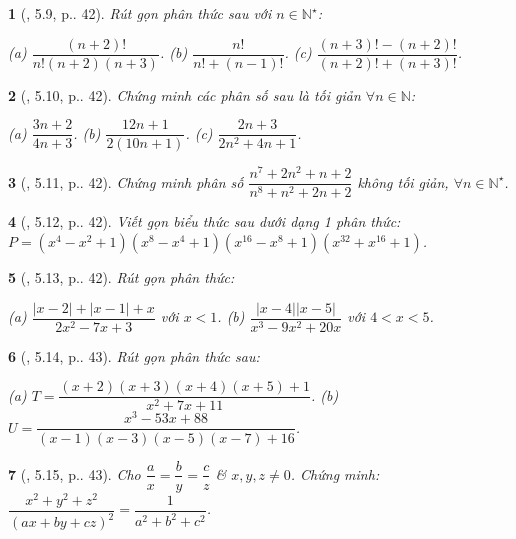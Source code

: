 \documentclass{article}
\newtheorem{baitoan}{}
\begin{document}
\begin{baitoan}[\cite{TLCT_THCS_Toan_8_dai_so}, 5.9, p.. 42]
	Rút gọn phân thức sau với $n\in\mathbb{N}^\star$:
	
		(a) $\dfrac{(n + 2)!}{n!(n + 2)(n + 3)}$.
		(b) $\dfrac{n!}{n! + (n - 1)!}$.
		(c) $\dfrac{(n + 3)! - (n + 2)!}{(n + 2)! + (n + 3)!}$.
	
\end{baitoan}

\begin{baitoan}[\cite{TLCT_THCS_Toan_8_dai_so}, 5.10, p.. 42]
	Chứng minh các phân số sau là tối giản $\forall n\in\mathbb{N}$:
	
		(a) $\dfrac{3n + 2}{4n + 3}$.
		(b) $\dfrac{12n + 1}{2(10n + 1)}$.
		(c) $\dfrac{2n + 3}{2n^2 + 4n + 1}$.
	
\end{baitoan}

\begin{baitoan}[\cite{TLCT_THCS_Toan_8_dai_so}, 5.11, p.. 42]
	Chứng minh phân số $\dfrac{n^7 + 2n^2 + n + 2}{n^8 + n^2 + 2n + 2}$ không tối giản, $\forall n\in\mathbb{N}^\star$.
\end{baitoan}

\begin{baitoan}[\cite{TLCT_THCS_Toan_8_dai_so}, 5.12, p.. 42]
	Viết gọn biểu thức sau dưới dạng 1 phân thức: $P = (x^4 - x^2 + 1)(x^8 - x^4 + 1)(x^{16} - x^8 + 1)(x^{32} + x^{16} + 1)$.
\end{baitoan}

\begin{baitoan}[\cite{TLCT_THCS_Toan_8_dai_so}, 5.13, p.. 42]
	Rút gọn phân thức:
	
		(a) $\dfrac{|x - 2| + |x - 1| + x}{2x^2 - 7x + 3}$ với $x < 1$.
		(b) $\dfrac{|x - 4||x - 5|}{x^3 - 9x^2 + 20x}$ với $4 < x < 5$.
	
\end{baitoan}

\begin{baitoan}[\cite{TLCT_THCS_Toan_8_dai_so}, 5.14, p.. 43]
	Rút gọn phân thức sau:
	
		(a) $T = \dfrac{(x + 2)(x + 3)(x + 4)(x + 5) + 1}{x^2 + 7x + 11}$.
		(b) $U = \dfrac{x^3 - 53x + 88}{(x - 1)(x - 3)(x - 5)(x - 7) + 16}$.
	
\end{baitoan}

\begin{baitoan}[\cite{TLCT_THCS_Toan_8_dai_so}, 5.15, p.. 43]
	Cho $\dfrac{a}{x} = \dfrac{b}{y} = \dfrac{c}{z}$ \& $x,y,z\ne 0$. Chứng minh: $\dfrac{x^2 + y^2 + z^2}{(ax + by + cz)^2} = \dfrac{1}{a^2 + b^2 + c^2}$.
\end{baitoan}
\end{document}
